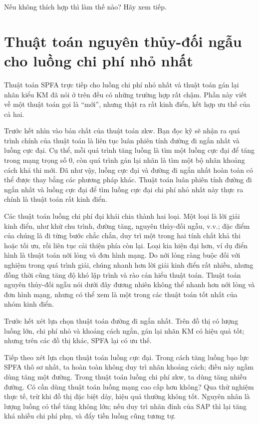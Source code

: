 \documentclass[11pt]{article}
\begin{document}
Nếu không thích hợp thì làm thế nào? Hãy xem tiếp.

\section{Thuật toán nguyên thủy-đối ngẫu cho luồng chi phí nhỏ nhất}

Thuật toán SPFA trực tiếp cho luồng chi phí nhỏ nhất và thuật toán gán lại
nhãn kiểu KM đã nói ở trên đều có những trường hợp rất chậm. Phần này viết về
một thuật toán gọi là ``mới'', nhưng thật ra rất kinh điển, kết hợp ưu thế của
cả hai.

Trước hết nhìn vào bản chất của thuật toán zkw. Bạn đọc kỹ sẽ nhận ra quá
trình chính của thuật toán là liên tục luân phiên tính đường đi ngắn nhất và
luồng cực đại. Cụ thể, mỗi quá trình tăng luồng là tìm một luồng cực đại để
tăng trong mạng trọng số $0$, còn quá trình gán lại nhãn là tìm một bộ nhãn
khoảng cách khả thi mới. Đã như vậy, luồng cực đại và đường đi ngắn nhất hoàn
toàn có thể được thay bằng các phương pháp khác. Thuật toán luân phiên tính
đường đi ngắn nhất và luồng cực đại để tìm luồng cực đại chi phí nhỏ nhất này
thực ra chính là thuật toán  rất kinh điển.

Các thuật toán luồng chi phí đại khái chia thành hai loại. Một loại là lời
giải kinh điển, như khử chu trình, đường tăng, nguyên thủy-đối ngẫu, v.v.; đặc
điểm của chúng là đi từng bước chắc chắn, duy trì một trong hai tính chất khả
thi hoặc tối ưu, rồi liên tục cải thiện phía còn lại. Loại kia hiện đại hơn,
ví dụ điển hình là thuật toán nới lỏng và đơn hình mạng. Do nới lỏng ràng buộc
đối với nghiệm trong quá trình giải, chúng nhanh hơn lời giải kinh điển rất
nhiều, nhưng đồng thời cũng tăng độ khó lập trình và rào cản hiểu thuật toán.
Thuật toán nguyên thủy-đối ngẫu nói dưới đây đương nhiên không thể nhanh hơn
nới lỏng và đơn hình mạng, nhưng có thể xem là một trong các thuật toán tốt
nhất của nhóm kinh điển.

Trước hết xét lựa chọn thuật toán đường đi ngắn nhất. Trên đồ thị có lượng
luồng lớn, chi phí nhỏ và khoảng cách ngắn, gán lại nhãn KM có hiệu quả tốt;
nhưng trên các đồ thị khác, SPFA lại có ưu thế.

Tiếp theo xét lựa chọn thuật toán luồng cực đại. Trong cách tăng luồng bạo lực
SPFA thô sơ nhất, ta hoàn toàn không duy trì nhãn khoảng cách; điều này ngầm
dùng tăng một đường. Trong thuật toán luồng chi phí zkw, ta dùng tăng nhiều
đường. Có cần dùng thuật toán luồng mạng cao cấp hơn không? Qua thử nghiệm
thực tế, trừ khi đồ thị đặc biệt dày, hiệu quả thường không tốt. Nguyên nhân
là lượng luồng có thể tăng không lớn; nếu duy trì nhãn đỉnh của SAP thì lại
tăng khá nhiều chi phí phụ, và đẩy tiền luồng cũng tương tự.
\end{document}
